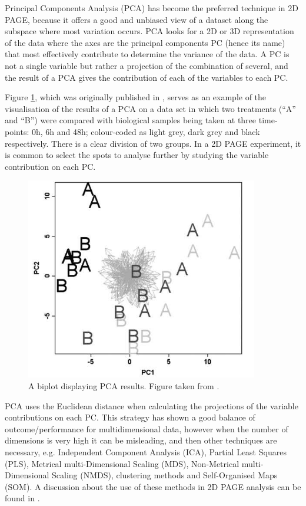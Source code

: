 Principal Components Analysis (PCA) has become the preferred technique in 2D PAGE, because it offers a good and unbiased view of a dataset along the subspace where most variation occurs. PCA looks for a 2D or 3D representation of the data where the axes are the principal components PC (hence its name) that most effectively contribute to determine the variance of the data. A PC is not a single variable but rather a projection of the combination of several, and the result of a PCA gives the contribution of each of the variables to each PC.

Figure \ref{fig:PCA}, which was originally published in \cite{SIL2014}, serves as an example of the visualisation of the results of a PCA on a data set in which two treatments (``A'' and ``B'') were compared with biological samples being taken at three time-points: 0h, 6h and 48h; colour-coded as light grey, dark grey and black respectively. There is a clear division of two groups. In a 2D PAGE experiment, it is common to select the spots to analyse further by studying the variable contribution on each PC.

\begin{figure}  
\centering
\includegraphics[width=4in]{figures/PCA.png}
\caption[Example of a PCA result plot.]{A biplot displaying PCA results. Figure taken from \cite{SIL2014}. 
\label{fig:PCA}}
\end{figure}

PCA uses the Euclidean distance when calculating the projections of the variable contributions on each PC. This strategy has shown a good balance of outcome/performance for multidimensional data, however when the number of dimensions is very high it can be misleading, and then other techniques are necessary, e.g. Independent Component Analysis (ICA), Partial Least Squares (PLS), Metrical multi-Dimensional Scaling (MDS), Non-Metrical multi-Dimensional Scaling (NMDS), clustering methods and Self-Organised Maps (SOM). A discussion about the use of these methods in 2D PAGE analysis can be found in \cite{SIL2014}.



